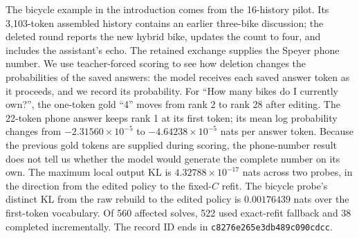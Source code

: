 The bicycle example in the introduction comes from the 16-history pilot.
Its 3,103-token assembled history contains an earlier three-bike discussion;
the deleted round reports the new hybrid bike, updates the count to four,
and includes the assistant's echo. The retained exchange supplies the Speyer
phone number. We use teacher-forced scoring to see how deletion changes the
probabilities of the saved answers: the model receives each saved answer
token as it proceeds, and we record its probability. For ``How many bikes do I currently own?'',
the one-token gold ``4'' moves from rank 2 to rank 28 after editing.
The 22-token phone answer keeps rank 1 at its first token; its mean log
probability changes from $-2.31560\times10^{-5}$ to
$-4.64238\times10^{-5}$ nats per answer token. Because the previous gold
tokens are supplied during scoring, the phone-number result does not tell
us whether the model would generate the complete number on its own.
The maximum local output KL is $4.32788\times10^{-17}$ nats across two probes,
in the direction from the edited policy to the fixed-$C$ refit. The bicycle probe's distinct
KL from the raw rebuild to the edited policy is $0.00176439$ nats over the first-token vocabulary.
Of 560 affected solves, 522 used exact-refit fallback and 38 completed
incrementally. The record ID ends in \texttt{c8276e265e3db489c090cdcc}.

\LMChatMainResultText

\LMChatAppendixText




